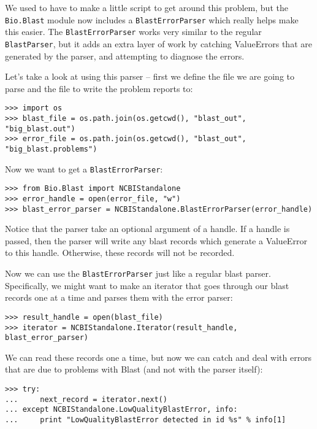 \documentclass{report}
\begin{document}
We used to have to make a little script to get around this problem, but the \verb|Bio.Blast| module now includes a \verb|BlastErrorParser| which really helps make this easier. The \verb|BlastErrorParser| works very similar to the regular \verb|BlastParser|, but it adds an extra layer of work by catching ValueErrors that are generated by the parser, and attempting to diagnose the errors.

Let's take a look at using this parser -- first we define the file we are going to parse and the file to write the problem reports to:

\begin{verbatim}
>>> import os
>>> blast_file = os.path.join(os.getcwd(), "blast_out", "big_blast.out")
>>> error_file = os.path.join(os.getcwd(), "blast_out", "big_blast.problems")
\end{verbatim}

Now we want to get a \verb|BlastErrorParser|:

\begin{verbatim}
>>> from Bio.Blast import NCBIStandalone
>>> error_handle = open(error_file, "w")
>>> blast_error_parser = NCBIStandalone.BlastErrorParser(error_handle)
\end{verbatim}

Notice that the parser take an optional argument of a handle. If a handle is passed, then the parser will write any blast records which generate a ValueError to this handle. Otherwise, these records will not be recorded.

Now we can use the \verb|BlastErrorParser| just like a regular blast parser. Specifically, we might want to make an iterator that goes through our blast records one at a time and parses them with the error parser:

\begin{verbatim}
>>> result_handle = open(blast_file)
>>> iterator = NCBIStandalone.Iterator(result_handle, blast_error_parser)
\end{verbatim}

We can read these records one a time, but now we can catch and deal with errors that are due to problems with Blast (and not with the parser itself):

\begin{verbatim}
>>> try:
...     next_record = iterator.next()
... except NCBIStandalone.LowQualityBlastError, info:
...     print "LowQualityBlastError detected in id %s" % info[1]
\end{verbatim}
\end{document}
